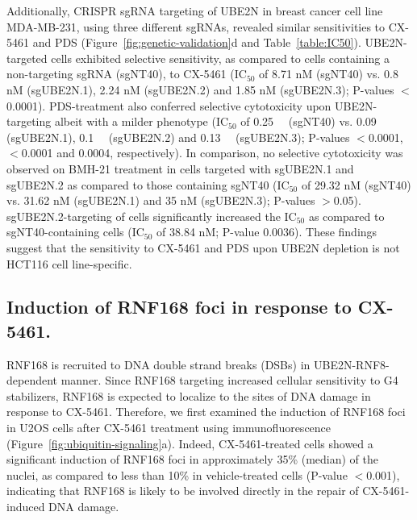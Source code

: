 Additionally, CRISPR sgRNA targeting of UBE2N in breast cancer cell line MDA-MB-231, using three different sgRNAs, revealed similar sensitivities to CX-5461 and PDS (Figure~\ref{fig:genetic-validation}d and Table~\ref{table:IC50}). UBE2N-targeted cells exhibited selective sensitivity, as compared to cells containing a non-targeting sgRNA (sgNT40), to CX-5461 (IC$_{50}$ of 8.71 nM (sgNT40) vs. 0.8 nM (sgUBE2N.1), 2.24 nM (sgUBE2N.2) and 1.85 nM (sgUBE2N.3); P-values $<$0.0001). PDS-treatment also conferred selective cytotoxicity upon UBE2N-targeting albeit with a milder phenotype (IC$_{50}$ of \SI{0.25}{\micro\Molar} (sgNT40) vs. \SI{0.09}{\micro\Molar} (sgUBE2N.1), \SI{0.1}{\micro\Molar} (sgUBE2N.2) and \SI{0.13}{\micro\Molar} (sgUBE2N.3); P-values $<$0.0001, $<$0.0001 and 0.0004, respectively). In comparison, no selective cytotoxicity was observed on BMH-21 treatment in cells targeted with sgUBE2N.1 and sgUBE2N.2 as compared to those containing sgNT40 (IC$_{50}$ of 29.32 nM (sgNT40) vs. 31.62 nM (sgUBE2N.1) and 35 nM (sgUBE2N.3); P-values $>$0.05). sgUBE2N.2-targeting of cells significantly increased the IC$_{50}$ as compared to sgNT40-containing cells (IC$_{50}$ of 38.84 nM; P-value 0.0036). These findings suggest that the sensitivity to CX-5461 and PDS upon UBE2N depletion is not HCT116 cell line-specific. 

\subsection{Induction of RNF168 foci in response to CX-5461.}
RNF168 is recruited to DNA double strand breaks (DSBs) in UBE2N-RNF8-dependent manner. Since RNF168 targeting increased cellular sensitivity to G4 stabilizers, RNF168 is expected to localize to the sites of DNA damage in response to CX-5461. Therefore, we first examined the induction of RNF168 foci in U2OS cells after CX-5461 treatment using immunofluorescence (Figure~\ref{fig:ubiquitin-signaling}a). Indeed, CX-5461-treated cells showed a significant induction of RNF168 foci in approximately 35\% (median) of the nuclei, as compared to less than 10\% in vehicle-treated cells (P-value $<$0.001), indicating that RNF168 is likely to be involved directly in the repair of CX-5461-induced DNA damage.

